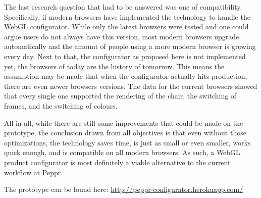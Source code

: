 The last research question that had to be answered was one of compatibility. Specifically, if modern browsers have implemented the technology to handle the WebGL configurator. While only the latest browsers were tested and one could argue users do not always have this version, most modern browsers upgrade automatically and the amount of people using a more modern browser is growing every day. Next to that, the configurator as proposed here is not implemented yet, the browsers of today are the history of tomorrow. This means the assumption may be made that when the configurator actually hits production, there are even newer browsers versions. The data for the current browsers showed that every single one supported the rendering of the chair, the switching of frames, and the switching of colours.\newline

All-in-all, while there are still some improvements that could be made on the prototype, the conclusion drawn from all objectives is that even without those optimizations, the technology saves time, is just as small or even smaller, works quick enough, and is compatible on all modern browsers. As such, a WebGL product configurator is most definitely a viable alternative to the current workflow at Peppr.

The prototype can be found here: \url{http://peppr-configurator.herokuapp.com/}